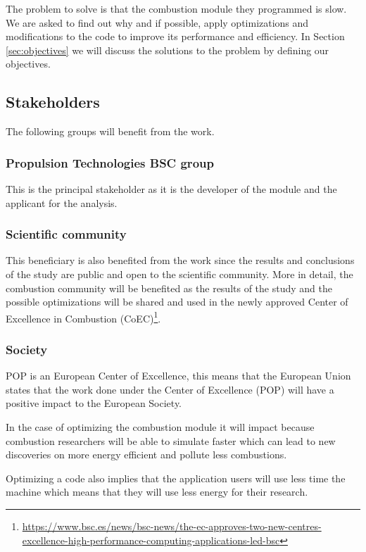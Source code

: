 \justify
The problem to solve is that the combustion module they programmed is slow. We are asked to find out why and if possible, apply optimizations and modifications to the code to improve its performance and efficiency. In Section \ref{sec:objectives} we will discuss the solutions to the problem by defining our objectives.


\subsection{Stakeholders}

\justify

The following groups will benefit from the work.

\subsubsection{Propulsion Technologies BSC group}

\justify
This is the principal stakeholder as it is the developer of the module and the applicant for the analysis.

\subsubsection{Scientific community}

\justify
This beneficiary is also benefited from the work since the results and conclusions of the study are public and open to the scientific community. More in detail, the combustion community will be benefited as the results of the study and the possible optimizations will be shared and used in the newly approved Center of Excellence in Combustion (CoEC)\footnote{\url{https://www.bsc.es/news/bsc-news/the-ec-approves-two-new-centres-excellence-high-performance-computing-applications-led-bsc}}. 

\subsubsection{Society}

\justify
POP is an European Center of Excellence, this means that the European Union states that the work done under the Center of Excellence (POP) will have a positive impact to the European Society.

\justify
In the case of optimizing the combustion module it will impact because combustion researchers will be able to simulate faster which can lead to new discoveries on more energy efficient and pollute less combustions.

\justify
Optimizing a code also implies that the application users will use less time the machine which means that they will use less energy for their research.
